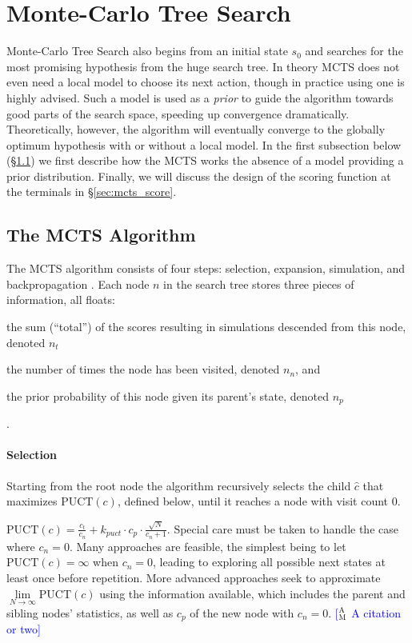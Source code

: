 \documentclass[11pt,a4paper]{article}
\newcommand{\ensuretext}[1]{#1}
\newcommand{\mycomment}[3]{\ensuretext{\textcolor{#3}{[#1 #2]}}}
\newcommand{\ammarker}{\ensuretext{\textcolor{blue}{\ensuremath{^{\textsc{A}}_{\textsc{M}}}}}}
\newcommand{\am}[1]{\mycomment{\ammarker}{#1}{blue}}
\begin{document}
\section{Monte-Carlo Tree Search}
\label{sec:mcts}
Monte-Carlo Tree Search also begins from an initial state $s_0$ and searches
for the most promising hypothesis from the huge search tree. In theory MCTS
does not even need a local model to choose its next action, though in practice
using one is highly advised. Such a model is used as a \emph{prior} to guide
the algorithm towards good parts of the search space, speeding up convergence
dramatically. Theoretically, however, the algorithm will eventually converge to
the globally optimum hypothesis with or without a local model. In the first
subsection below (\S \ref{sec:mcts_alg}) we first describe how the MCTS works
the absence of a model providing a prior distribution. Finally, we will discuss
the design of the scoring function at the terminals in \S \ref{sec:mcts_score}.

\subsection{The MCTS Algorithm}
\label{sec:mcts_alg}
The MCTS algorithm consists of four steps: selection, expansion, simulation,
and backpropagation \cite{chaslot2008progressive}. Each node $n$ in the search
tree stores three pieces of information, all floats:
\begin{enumerate*}[(1)]
\item the sum (``total'') of the scores resulting in simulations descended from this node, denoted $n_t$
\item the number of times the node has been visited, denoted $n_n$, and
\item the prior probability of this node given its parent's state, denoted $n_p$
\end{enumerate*}.

\paragraph{Selection}
Starting from the root node the algorithm recursively selects the child
$\hat{c}$ that maximizes $\text{PUCT}(c)$, defined below, until it reaches a
node with visit count 0.

$\text{PUCT}(c) = \frac{c_t}{c_n} + k_{puct} \cdot c_p \cdot \frac{\sqrt{N}}{c_n + 1}$.
Special care must be taken to handle the case where $c_n = 0$.
Many approaches are feasible, the simplest being to let $\text{PUCT}(c) = \infty$ when $c_n = 0$, leading
to exploring all possible next states at least once before repetition.
More advanced approaches seek to approximate $\lim\limits_{N \to \infty} \text{PUCT}(c)$ using the information available,
which includes the parent and sibling nodes' statistics, as well as $c_p$ of the new node with $c_n = 0$.
\am{A citation or two}
\end{document}
